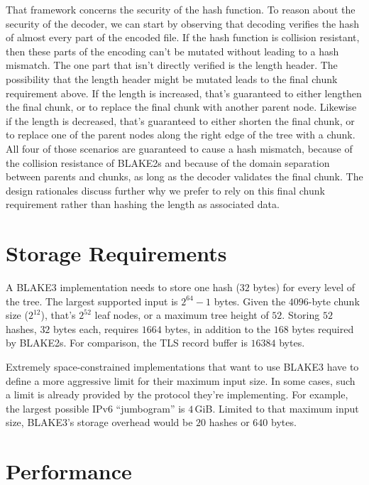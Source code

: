 \documentclass[11pt,notitlepage,a4paper]{article}
\begin{document}
That framework concerns the security of the hash function. To reason about the security of the decoder, we can start by observing that decoding verifies the hash of almost every part of the encoded file. If the hash function is collision resistant, then these parts of the encoding can't be mutated without leading to a hash mismatch. The one part that isn't directly verified is the length header. The possibility that the length header might be mutated leads to the final chunk requirement above. If the length is increased, that's guaranteed to either lengthen the final chunk, or to replace the final chunk with another parent node. Likewise if the length is decreased, that's guaranteed to either shorten the final chunk, or to replace one of the parent nodes along the right edge of the tree with a chunk. All four of those scenarios are guaranteed to cause a hash mismatch, because of the collision resistance of BLAKE2s and because of the domain separation between parents and chunks, as long as the decoder validates the final chunk. The design rationales discuss further why we prefer to rely on this final chunk requirement rather than hashing the length as associated data.

\section{Storage Requirements}\label{sec:storage}

A BLAKE3 implementation needs to store one hash ($32$ bytes) for every level of the tree. The largest supported input is $2^{64} - 1$ bytes. Given the $4096$-byte chunk size ($2^{12}$), that's $2^{52}$ leaf nodes, or a maximum tree height of $52$. Storing $52$ hashes, $32$ bytes each, requires $1664$ bytes, in addition to the $168$ bytes required by BLAKE2s. For comparison, the TLS record buffer is $16384$ bytes.

Extremely space-constrained implementations that want to use BLAKE3 have to define a more aggressive limit for their maximum input size. In some cases, such a limit is already provided by the protocol they're implementing. For example, the largest possible IPv6 ``jumbogram'' is $4$\,GiB. Limited to that maximum input size, BLAKE3's storage overhead would be $20$ hashes or $640$ bytes.


\section{Performance}\label{sec:performance}
\end{document}
